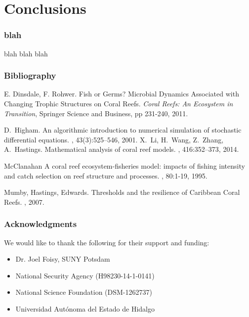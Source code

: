 
\section{Conclusions}


\begin{frame}
  \frametitle{blah}

  blah blah blah

\end{frame}

 
\begin{frame}
  \frametitle{Bibliography}

 \begin{thebibliography}{1}
 
   E. Dinsdale, F. Rohwer.
   \newblock Fish or Germs? Microbial Dynamics Associated with Changing Trophic Structures on Coral Reefs.
   \newblock \emph{Coral Reefs: An Ecosystem in Transition}, Springer Science and Business, pp 231-240, 2011.

   D.~Higham.
   \newblock An algorithmic introduction to numerical simulation of stochastic
   differential equations.
   , 43(3):525--546, 2001.
   X.~Li, H.~Wang, Z.~Zhang, A.~Hastings.
   \newblock Mathematical analysis of coral reef models.
   , 416:352--373, 2014.

    McClanahan
    \newblock A coral reef ecosystem-fisheries model: impacts of fishing intensity and catch selection on reef structure and processes.
    , 80:1-19, 1995.

    Mumby, Hastings, Edwards.
    \newblock Thresholds and the resilience of Caribbean Coral Reefs.
    , 2007.
  \end{thebibliography}
  
\end{frame}

\begin{frame}
  \frametitle{Acknowledgments}
  
  We would like to thank the following for their support and funding: 
  
 \begin{itemize}
 \item Dr. Joel Foisy, SUNY Potsdam
 \item National Security Agency (H98230-14-1-0141)
 \item National Science Foundation (DSM-1262737)
 \item Universidad Aut\'onoma del Estado de Hidalgo
 \end{itemize}
\end{frame}


